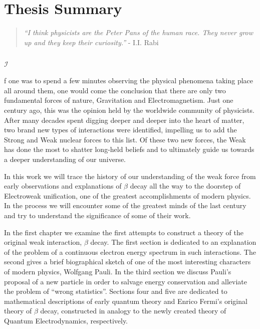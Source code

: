 \documentclass[a4paper,12pt]{book}
\begin{document}

\chapter*{Thesis Summary}



\begin{quotation}
 \textit{“I think physicists are the Peter Pans of the human race. They never grow up and they keep their curiosity.”} - I.I. Rabi
\end{quotation}

\paragraph*{}\begin{Large}$\mathcal{I}$\end{Large}f one was to spend a few minutes observing the physical phenomena taking place all around them, one would come the conclusion that there are only two fundamental forces of nature, Gravitation and Electromagnetism. Just one century ago, this was the opinion held by the worldwide community of physicists. After many decades spent digging deeper and deeper into the heart of matter, two brand new types of interactions were identified, impelling us to add the Strong and Weak nuclear forces to this list. Of these two new forces, the Weak has done the most to shatter long-held beliefs and to ultimately guide us towards a deeper understanding of our universe. 

In this work we will trace the history of our understanding of the weak force from early observations and explanations of $\beta$ decay all the way to the doorstep of Electroweak unification, one of the greatest accomplishments of modern physics. In the process we will encounter some of the greatest minds of the last century and try to understand the significance of some of their work.

In the first chapter we examine the first attempts to construct a theory of the original weak interaction, $\beta$ decay. The first section is dedicated to an explanation of the problem of a continuous electron energy spectrum in such interactions. The second gives a brief biographical sketch of one of the most interesting characters of modern physics, Wolfgang Pauli. In the third section we discuss Pauli's proposal of a new particle in order to salvage energy conservation and alleviate the problem of ``wrong statistics''. Sections four and five are dedicated to mathematical descriptions of early quantum theory and Enrico Fermi's original theory of $\beta$ decay, constructed in analogy to the newly created theory of Quantum Electrodynamics, respectively.
\end{document}
